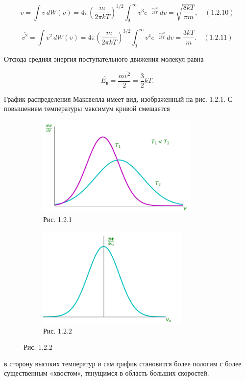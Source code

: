 $$v=\int v\,dW(v)=4\pi \left(\frac{m}{2\pi kT}\right)^{3/2}\int_{0}^{\infty}v^3e^{-\frac{mv^2}{2kT}}\, dv= \sqrt{\frac{8kT}{\pi m}},\quad (1.2.10)$$

$$\overline{v^2}=\int v^2\,dW(v)=4\pi \left(\frac{m}{2\pi kT}\right)^{3/2}\int_{0}^{\infty}v^4e^{-\frac{mv^2}{2kT}}\, dv= \frac{3kT}{ m}.\quad (1.2.11)$$

Отсюда средняя энергия поступательного движения молекул равна

$$\overline{E_\text{к}}=\frac{m\overline{v^2}}{2}=\frac{3}{2}kT.$$

График распределения Максвелла имеет вид, изображенный на рис. 1.2.1. С повышением температуры максимум кривой смещается
\begin{figure}[ht]
	\centering
\hspace*{\fill}%
\begin{subfigure}[b]{0.49\textwidth}
        \centering
		\includegraphics[height=5cm,keepaspectratio]{images/maxwell2.png}
        \caption{Рис. 1.2.1}
	\end{subfigure}
	\begin{subfigure}[b]{0.49\textwidth}
        \centering
		\includegraphics[height=5cm,keepaspectratio]{images/maxwell1.png}
		\caption{Рис. 1.2.2}
	\end{subfigure}
 \hfill
 \hspace*{\fill}%
 \end{figure}

 в сторону высоких температур и сам график становится более пологим с более существенным «хвостом», тянущимся в область больших скоростей.

